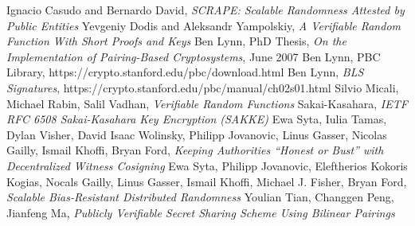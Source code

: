 \documentclass[article,oneside]{memoir}
\begin{document}
\begin{thebibliography}{99}

Ignacio Casudo and Bernardo David, {\em{ SCRAPE: Scalable Randomness Attested by Public Entities}} 
Yevgeniy Dodis and Aleksandr Yampolskiy, {\em{A Verifiable Random Function With Short Proofs and Keys}}
 Ben Lynn, PhD Thesis, {\em{On the Implementation of Pairing-Based Cryptosystems}}, June 2007
 Ben Lynn, PBC Library, https://crypto.stanford.edu/pbc/download.html
 Ben Lynn, {\em{BLS Signatures}}, https://crypto.stanford.edu/pbc/manual/ch02s01.html
Silvio Micali, Michael Rabin, Salil Vadhan, {\em{Verifiable Random Functions}}
Sakai-Kasahara, {\em{IETF RFC 6508 Sakai-Kasahara Key Encryption (SAKKE)}} 
Ewa Syta, Iulia Tamas, Dylan Visher, David Isaac Wolinsky, Philipp Jovanovic, Linus Gasser, Nicolas Gailly, Ismail Khoffi, Bryan Ford, {\em{Keeping Authorities ``Honest or Bust'' with Decentralized Witness Cosigning}}
 Ewa Syta, Philipp Jovanovic, Eleftherios Kokoris Kogias, Nocals Gailly, Linus Gasser, Ismail Khoffi, Michael J. Fisher, Bryan Ford, {\em{Scalable Bias-Resistant Distributed Randomness}}
 Youlian Tian, Changgen Peng, Jianfeng Ma, {\em{Publicly Verifiable Secret Sharing Scheme Using Bilinear Pairings}} 
\end{thebibliography} 
\end{document}
